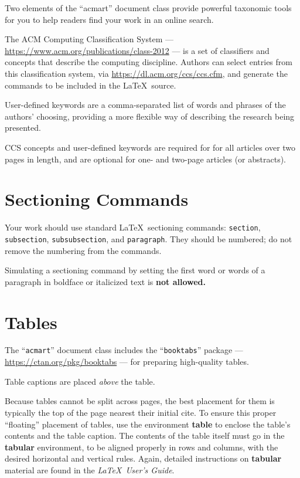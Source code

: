 \documentclass[manuscript,screen]{acmart}
\begin{document}
Two elements of the ``acmart'' document class provide powerful taxonomic
tools for you to help readers find your work in an online search.

The ACM Computing Classification System ---
\url{https://www.acm.org/publications/class-2012} --- is a set of
classifiers and concepts that describe the computing discipline. Authors
can select entries from this classification system, via
\url{https://dl.acm.org/ccs/ccs.cfm}, and generate the commands to be
included in the \LaTeX~source.

User-defined keywords are a comma-separated list of words and phrases of
the authors' choosing, providing a more flexible way of describing the
research being presented.

CCS concepts and user-defined keywords are required for for all articles
over two pages in length, and are optional for one- and two-page
articles (or abstracts).

\hypertarget{sectioning-commands}{%
\section{Sectioning Commands}\label{sectioning-commands}}

Your work should use standard \LaTeX~sectioning commands:
\texttt{section}, \texttt{subsection}, \texttt{subsubsection}, and
\texttt{paragraph}. They should be numbered; do not remove the numbering
from the commands.

Simulating a sectioning command by setting the first word or words of a
paragraph in boldface or italicized text is \textbf{not allowed.}

\hypertarget{tables}{%
\section{Tables}\label{tables}}

The ``\texttt{acmart}'' document class includes the
``\texttt{booktabs}'' package --- \url{https://ctan.org/pkg/booktabs}
--- for preparing high-quality tables.

Table captions are placed \emph{above} the table.

Because tables cannot be split across pages, the best placement for them
is typically the top of the page nearest their initial cite. To ensure
this proper ``floating'' placement of tables, use the environment
\textbf{table} to enclose the table's contents and the table caption.
The contents of the table itself must go in the \textbf{tabular}
environment, to be aligned properly in rows and columns, with the
desired horizontal and vertical rules. Again, detailed instructions on
\textbf{tabular} material are found in the \emph{\LaTeX~User's Guide}.
\end{document}
